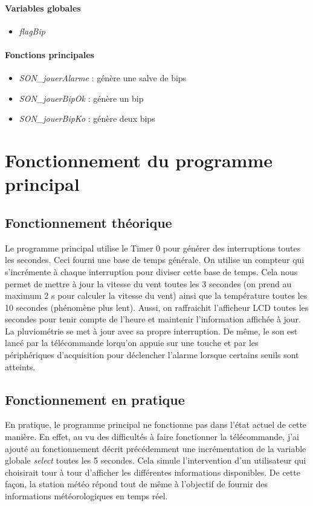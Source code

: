 \documentclass[a4paper]{report}
\begin{document}
\paragraph{Variables globales}
\begin{itemize}
\item \emph{flagBip}
\end{itemize}
\paragraph{Fonctions principales}
\begin{itemize}
\item \emph{SON\_jouerAlarme} : génère une salve de bips
\item \emph{SON\_jouerBipOk} : génère un bip
\item \emph{SON\_jouerBipKo} : génère deux bips
\end{itemize}


\section{Fonctionnement du programme principal}
\subsection{Fonctionnement théorique}
Le programme principal utilise le Timer 0 pour générer des interruptions toutes les secondes. Ceci fourni une base de temps générale.
On utilise un compteur qui s'incrémente à chaque interruption pour diviser cette base de temps.
Cela nous permet de mettre à jour la vitesse du vent toutes les 3 secondes (on prend au maximum 2 s pour calculer la vitesse du vent) ainsi que la température toutes les 10 secondes (phénomène plus lent).
Aussi, on raffraichit l'afficheur LCD toutes les secondes pour tenir compte de l'heure et maintenir l'information affichée à jour.
La pluviométrie se met à jour avec sa propre interruption.
De même, le son est lancé par la télécommande lorqu'on appuie sur une touche et par les périphériques d'acquisition pour déclencher l'alarme lorsque certains seuils sont atteints.

\subsection{Fonctionnement en pratique}
En pratique, le programme principal ne fonctionne pas dans l'état actuel de cette manière.
En effet, au vu des difficultés à faire fonctionner la télécommande, j'ai ajouté au fonctionnement décrit précédemment une incrémentation de la variable globale \emph{select} toutes les 5 secondes.
Cela simule l'intervention d'un utilisateur qui choisirait tour à tour d'afficher les différentes informations disponibles.
De cette façon, la station météo répond tout de même à l'objectif de fournir des informations météorologiques en temps réel.
\end{document}
